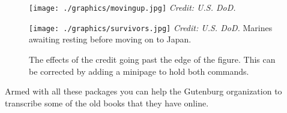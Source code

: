 \providecommand\addcredit[1]{%
 \vspace*{-6.5pt}
 \scriptsize%
 \flushright%
 \textit{Credit: #1}%
}
\newpage
\pagestyle{empty}
\thispagestyle{empty}
\begin{figure}[htp]
\centering

\captionsetup{name=Photo., labelsep=period}%
   \begin{minipage}[t]{0.48\textwidth}
      \texttt{[image: ./graphics/movingup.jpg]}%
      \addcredit{U.S. DoD.}%
     \caption{The effects of the credit going past the edge of the figure. This can be corrected by adding a minipage to hold both commands. }
\end{minipage}\hfill\hfill
\begin{minipage}[t]{0.48\textwidth}
      \texttt{[image: ./graphics/survivors.jpg]}%
      \addcredit{U.S. DoD.}%
    {\footnotesize Marines awaiting resting before moving on to Japan. }
\end{minipage}

\end{figure}
\newpage


Armed with all these packages you can help the Gutenburg organization to transcribe
some of the old books that they have online. 

\clearpage







